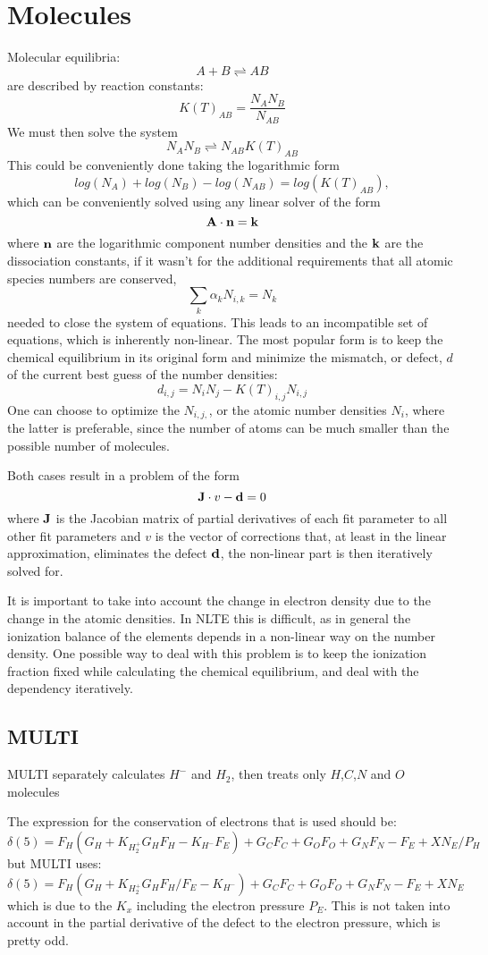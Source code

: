 \documentclass[a4paper]{article}
\begin{document}
\section{Molecules}
Molecular equilibria:
$$
A + B \rightleftharpoons AB
$$
are described by reaction constants:
$$
K(T)_{AB}=\frac{N_AN_B}{N_{AB}}
$$
We must then solve the system
$$
N_A N_B \rightleftharpoons N_{AB} K(T)_{AB}
$$
This could be conveniently done taking the logarithmic form
$$
log(N_A)+log(N_B)-log(N_{AB})=log(K(T)_{AB}),
$$
which can be conveniently solved using any linear solver of the form
$$
{\bf A} \cdot {\bf n} = {\bf k}
$$
where ${\bf n}$ are the logarithmic component number densities and the ${\bf k}$ are the dissociation constants,
if it wasn't for the additional requirements that all atomic species numbers are conserved,
$$
\sum_k \alpha_k N_{i,k} = N_k
$$
needed to close the system of equations. This leads to an incompatible set of equations, which is inherently non-linear. The most popular form is to keep the chemical equilibrium in its original form and minimize the mismatch, or defect, $d$ of the current best guess of the number densities:
$$
d_{i,j}=N_i N_j - K(T)_{i,j}N_{i,j}
$$
One can choose to optimize the $N_{i,j,}$, or the atomic number densities $N_i$, where the latter is preferable, since the number of atoms can be much smaller than the possible number of molecules.

Both cases result in a problem of the form
$$
{\bf J}\cdot v - {\bf d} = 0
$$
where ${\bf J}$ is the Jacobian matrix of partial derivatives of each fit parameter to all other fit parameters and $v$ is the vector of corrections that, at least in the linear approximation, eliminates the defect ${\bf d}$, the non-linear part is then iteratively solved for.

It is important to take into account the change in electron density due to the change in the atomic densities. In NLTE this is difficult, as in general the ionization balance of the elements depends in a non-linear way on the number density. One possible way to deal with this problem is to keep the ionization fraction fixed while calculating the chemical equilibrium, and deal with the dependency iteratively. 

\subsection{MULTI}
MULTI separately calculates $H^-$ and $H_2$, then treats only $H$,$C$,$N$ and $O$ molecules 

The expression for the conservation of electrons that is used should be:
$$
\delta(5)=F_H(G_H+K_{H_2^+} G_H F_H-K_{H^-}F_E)+G_C F_C+G_O F_O+G_N F_N-F_E+XN_E/P_H
$$
but MULTI uses:
$$
\delta(5)=F_H(G_H+K_{H_2^+} G_H F_H/F_E-K_{H^-})+G_C F_C+G_O F_O+G_N F_N-F_E+XN_E
$$
which is due to the $K_x$ including the electron pressure $P_E$. This is not taken into account in the partial derivative of the defect to the electron pressure, which is pretty odd.
\end{document}
